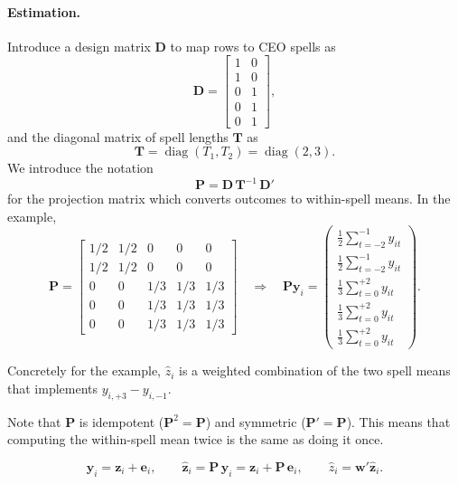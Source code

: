 \documentclass[11pt,a4paper]{article}
\begin{document}
\paragraph{Estimation.} Introduce a design matrix $\mathbf D$ to map rows to CEO spells as
\[
  \mathbf D = \begin{bmatrix}
    1 & 0\\
    1 & 0\\
    0 & 1\\
    0 & 1\\
    0 & 1
  \end{bmatrix},
\]
and the diagonal matrix of spell lengths $\mathbf T$ as
$$
  \mathbf T = \operatorname{diag}(T_1,T_2)=\operatorname{diag}(2,3).
$$
We introduce the notation
$$
  \mathbf P = \mathbf D\,\mathbf T^{-1}\,\mathbf D'
$$
for the projection matrix which converts outcomes to within-spell means. In the example,
\[
  \mathbf P = \begin{bmatrix}
    1/2 & 1/2 & 0 & 0 & 0\\
    1/2 & 1/2 & 0 & 0 & 0\\
    0 & 0 & 1/3 & 1/3 & 1/3\\
    0 & 0 & 1/3 & 1/3 & 1/3\\
    0 & 0 & 1/3 & 1/3 & 1/3
  \end{bmatrix}\quad\Rightarrow\quad
  \mathbf {Py}_i = 
  \begin{pmatrix}
  \frac12 \sum_{t=-2}^{-1} y_{it} \\
  \frac12 \sum_{t=-2}^{-1} y_{it} \\
  \frac13 \sum_{t=0}^{+2} y_{it}\\
  \frac13 \sum_{t=0}^{+2} y_{it}\\
  \frac13 \sum_{t=0}^{+2} y_{it}
  \end{pmatrix}.
\]

Concretely for the example, $\hat z_i$ is a weighted combination of the two spell means that implements $y_{i,+3}-y_{i,-1}$.

Note that $\mathbf P$ is idempotent ($\mathbf P^2=\mathbf P$) and symmetric ($\mathbf P'=\mathbf P$). This means that computing the within-spell mean twice is the same as doing it once.




\[
  \mathbf y_i = \mathbf z_i + \mathbf e_i,\qquad \hat{\mathbf z}_i = \mathbf P\,\mathbf y_i=\mathbf z_i + \mathbf P\,\mathbf e_i,\qquad \hat z_i = \mathbf w'\hat{\mathbf z}_i.
\]
\end{document}
